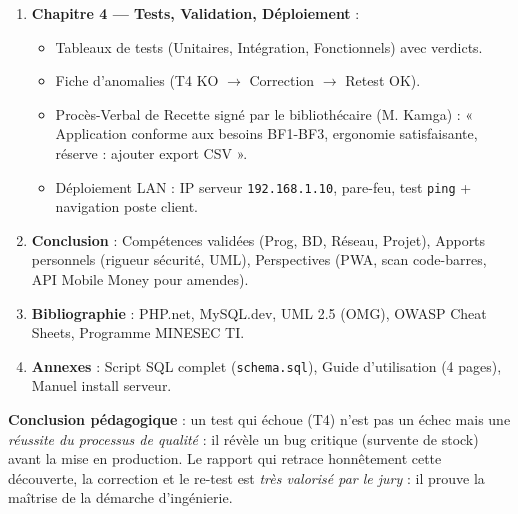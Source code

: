 \documentclass[11pt]{article}
\begin{document}
\begin{exoresolu}
\begin{enumerate}
\begin{itemize}
      \end{itemize}
\item \textbf{Chapitre 4 — Tests, Validation, Déploiement} :
      \begin{itemize}
      \item Tableaux de tests (Unitaires, Intégration, Fonctionnels) avec verdicts.
      \item Fiche d'anomalies (T4 KO $\rightarrow$ Correction $\rightarrow$ Retest OK).
      \item Procès-Verbal de Recette signé par le bibliothécaire (M. Kamga) : « Application conforme aux besoins BF1-BF3, ergonomie satisfaisante, réserve : ajouter export CSV ».
      \item Déploiement LAN : IP serveur \texttt{192.168.1.10}, pare-feu, test \texttt{ping} + navigation poste client.
      \end{itemize}
\item \textbf{Conclusion} : Compétences validées (Prog, BD, Réseau, Projet), Apports personnels (rigueur sécurité, UML), Perspectives (PWA, scan code-barres, API Mobile Money pour amendes).
\item \textbf{Bibliographie} : PHP.net, MySQL.dev, UML 2.5 (OMG), OWASP Cheat Sheets, Programme MINESEC TI.
\item \textbf{Annexes} : Script SQL complet (\texttt{schema.sql}), Guide d'utilisation (4 pages), Manuel install serveur.
\end{enumerate}
\textbf{Conclusion pédagogique} : un test qui échoue (T4) n'est pas un échec mais une \emph{réussite du processus de qualité} : il révèle un bug critique (survente de stock) avant la mise en production. Le rapport qui retrace honnêtement cette découverte, la correction et le re-test est \emph{très valorisé par le jury} : il prouve la maîtrise de la démarche d'ingénierie.
\end{exoresolu}
\end{document}
